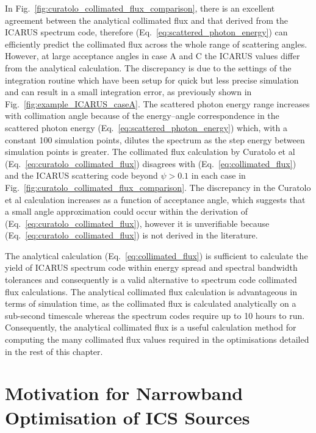 \documentclass[../main.tex]{subfiles}
\begin{document}
In Fig.~\ref{fig:curatolo_collimated_flux_comparison}, there is an excellent agreement between the analytical collimated flux and that derived from the \textsc{ICARUS} spectrum code, therefore (Eq.~\ref{eq:scattered_photon_energy}) can efficiently predict the collimated flux across the whole range of scattering angles. However, at large acceptance angles in case A and C the \textsc{ICARUS} values differ from the analytical calculation. The discrepancy is due to the settings of the integration routine which have been setup for quick but less precise simulation and can result in a small integration error, as previously shown in Fig.~\ref{fig:example_ICARUS_caseA}. The scattered photon energy range increases with collimation angle because of the energy--angle correspondence  in the scattered photon energy (Eq.~\ref{eq:scattered_photon_energy}) which, with a constant 100 simulation points, dilutes the spectrum as the step energy between simulation points is greater. The collimated flux calculation by Curatolo et al \cite{curatolo2017analytical} (Eq.~\ref{eq:curatolo_collimated_flux}) disagrees with (Eq.~\ref{eq:collimated_flux}) and the \textsc{ICARUS} scattering code beyond $\psi>0.1$ in each case in Fig.~\ref{fig:curatolo_collimated_flux_comparison}. The discrepancy in the Curatolo et al calculation increases as a function of acceptance angle, which suggests that a small angle approximation could occur within the derivation of (Eq.~\ref{eq:curatolo_collimated_flux}), however it is unverifiable because (Eq.~\ref{eq:curatolo_collimated_flux}) is not derived in the literature.  

The analytical calculation (Eq.~\ref{eq:collimated_flux}) is sufficient to calculate the yield of \textsc{ICARUS} spectrum code within energy spread and spectral bandwidth tolerances and consequently is a valid alternative to spectrum code collimated flux calculations. The analytical collimated flux calculation is advantageous in terms of simulation time, as the collimated flux is calculated analytically on a sub-second timescale whereas the spectrum codes require up to 10 hours to run. Consequently, the analytical collimated flux is a useful calculation method for computing the many collimated flux values required in the optimisations detailed in the rest of this chapter.   

\section{Motivation for Narrowband Optimisation of ICS Sources}
\label{sec:motivation_optimisation}
\end{document}
